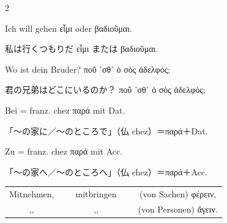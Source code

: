 \begin{paracol}{2}
\begin{enumerate}[leftmargin=0pt,rightmargin=0pt,listparindent =1cm,labelindent=1cm,labelsep=1ex,labelwidth={*},itemindent={*},align=left]
\begin{german}
\begin{continuousitemline}Ich will gehen \textgreek[variant=ancient]{εἶμι}
oder \textgreek[variant=ancient]{βαδιοῦμαι.}\par\end{continuousitemline}
\end{german}
\switchcolumn

\begin{japanese}
私は行くつもりだ \textgreek[variant=ancient]{εἶμι} または \textgreek[variant=ancient]{βαδιοῦμαι.}
\end{japanese}
\switchcolumn*

\begin{german}
\item Wo ist dein Bruder? \textgreek[variant=ancient]{ποῦ ᾽σθ᾽ ὁ σὸς ἀδελφός;}
\end{german}
\switchcolumn

\begin{japanese}
君の兄弟はどこにいるのか？ \textgreek[variant=ancient]{ποῦ ᾽σθ᾽ ὁ σὸς ἀδελφός;}
\end{japanese}
\switchcolumn*

\begin{german}
\item Bei = franz. \textfrench{chez} \textgreek[variant=ancient]{παρά} mit
\textlatin{Dat.}
\end{german}
\switchcolumn

\begin{japanese}
「〜の家に／〜のところで」（仏 \textfrench{chez}）＝\textgreek[variant=ancient]{παρά}＋\textlatin{Dat.}
\end{japanese}
\switchcolumn*

\begin{german}
\begin{continuousitemline}Zu = franz. \textfrench{chez} \textgreek[variant=ancient]{παρά}
mit \textlatin{Acc.}\par\end{continuousitemline}
\end{german}
\switchcolumn

\begin{japanese}
「〜の家へ／〜のところへ」（仏 \textfrench{chez}）＝\textgreek[variant=ancient]{παρά}＋\textlatin{Acc.}
\end{japanese}
\switchcolumn*

\begin{german}
\item %
\begin{tabular}[t]{ccccc}
Mitnehmen, & ~ & mitbringen & ~ & (von Sachen) \textgreek[variant=ancient]{φέρειν,}\tabularnewline
,, &  & ,, &  & (von Personen) \textgreek[variant=ancient]{ἄγειν.}\tabularnewline
\end{tabular}
\end{german}
\switchcolumn


\end{enumerate}
\end{paracol}
